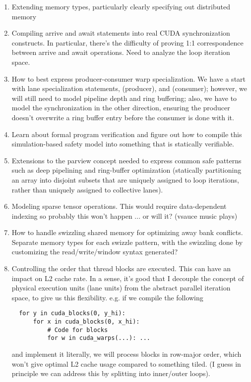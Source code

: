 \begin{enumerate}
  \item Extending memory types, particularly clearly specifying out distributed memory
  \filbreak
  \item Compiling arrive and await statements into real CUDA synchronization constructs.
    In particular, there's the difficulty of proving 1:1 correspondence between arrive and await operations.
    Need to analyze the loop iteration space.
  \filbreak
  \item How to best express producer-consumer warp specialization.
    We have a start with lane specialization statements,  (producer), and  (consumer); however, we will still need to model pipeline depth and ring buffering; also, we have to model the synchronization in the other direction, ensuring the producer doesn't overwrite a ring buffer entry before the consumer is done with it.
  \filbreak
  \item Learn about formal program verification and figure out how to compile this simulation-based safety model into something that is statically verifiable.
  \filbreak
  \item Extensions to the parview concept needed to express common safe patterns such as deep pipelining and ring-buffer optimization (statically partitioning an array into disjoint subsets that are uniquely assigned to loop iterations, rather than uniquely assigned to collective lanes).
  \filbreak
  \item Modeling sparse tensor operations. This would require data-dependent indexing so probably this won't happen ... or will it? (vsauce music plays)
  \filbreak
  \item How to handle swizzling shared memory for optimizing away bank conflicts.
    Separate memory types for each swizzle pattern, with the swizzling done by customizing the read/write/window syntax generated?
  \filbreak
  \item Controlling the order that thread blocks are executed.
  This can have an impact on L2 cache rate.
  In a sense, it's good that I decouple the concept of physical execution units (lane units) from the abstract parallel iteration space, to give us this flexibility. e.g. if we compile the following
  \filbreak
{
\color{lightttColor}
\begin{verbatim}
  for y in cuda_blocks(0, y_hi):
      for x in cuda_blocks(0, x_hi):
          # Code for blocks
          for w in cuda_warps(...): ...
\end{verbatim}
}
  \filbreak
  and implement it literally, we will process blocks in row-major order, which won't give optimal L2 cache usage compared to something tiled.
  (I guess in principle we can address this by splitting into inner/outer loops).
\end{enumerate}

